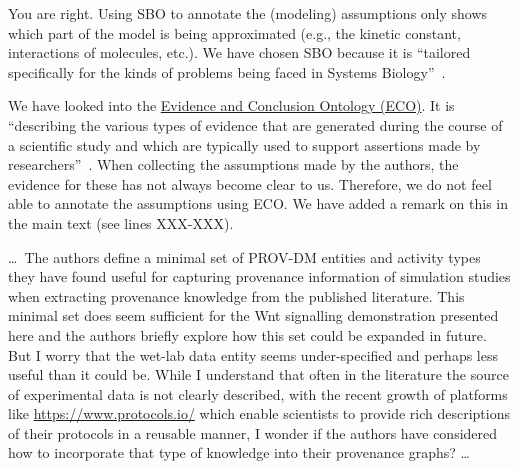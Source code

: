 \documentclass{article}
\begin{document}
You are right.
Using SBO to annotate the (modeling) assumptions only shows which part of the model is being approximated (e.g., the kinetic constant, interactions of molecules, etc.).
We have chosen SBO because it is \enquote{tailored specifically for the kinds of problems being faced in Systems Biology}~\cite{SBOidentifiers}.

We have looked into the \href{https://evidenceontology.org/}{Evidence and Conclusion Ontology (ECO)}.
It is \enquote{describing the various types of evidence that are generated during the course of a scientific study and which are typically used to support assertions made by researchers}~\cite{Chibucos2017}.
When collecting the assumptions made by the authors, the evidence for these has not always become clear to us.
Therefore, we do not feel able to annotate the assumptions using ECO.
We have added a remark on this in the main text (see lines XXX-XXX).


\begin{mdframed}
\ldots\, The authors define a minimal set of PROV-DM entities and activity types they have found useful for capturing provenance information of simulation studies when extracting provenance knowledge from the published literature.
This minimal set does seem sufficient for the Wnt signalling demonstration presented here and the authors briefly explore how this set could be expanded in future.
But I worry that the wet-lab data entity seems under-specified and perhaps less useful than it could be.
While I understand that often in the literature the source of experimental data is not clearly described, with the recent growth of platforms like \url{https://www.protocols.io/} which enable scientists to provide rich descriptions of their protocols in a reusable manner, I wonder if the authors have considered how to incorporate that type of knowledge into their provenance graphs? \ldots
\end{mdframed}
\end{document}
